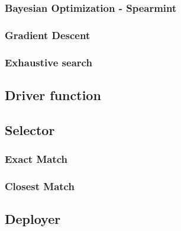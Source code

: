 \documentclass{article}
\begin{document}
\subsubsection{Bayesian Optimization - Spearmint}
\subsubsection{Gradient Descent}
\subsubsection{Exhaustive search}
\subsection{Driver function}

\subsection{Selector}
\subsubsection{Exact Match}
\subsubsection{Closest Match}
\subsection{Deployer}
\end{document}
